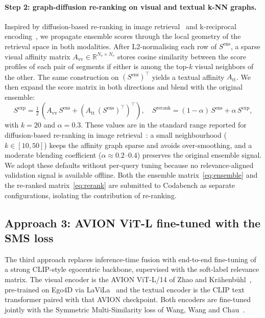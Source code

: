 \paragraph{Step 2: graph-diffusion re-ranking on visual and textual k-NN graphs.}
Inspired by diffusion-based re-ranking in image retrieval~\cite{iscen2017diffusion} and k-reciprocal encoding~\cite{zhong2017kreciprocal}, we propagate ensemble scores through the local geometry of the retrieval space in both modalities. After L2-normalising each row of $S^{\mathrm{ens}}$, a sparse visual affinity matrix $A_{\mathrm{vv}} \in \mathbb{R}^{N_v\times N_v}$ stores cosine similarity between the score profiles of each pair of segments if either is among the top-$k$ visual neighbors of the other. The same construction on $(S^{\mathrm{ens}})^{\!\top}$ yields a textual affinity $A_{\mathrm{tt}}$. We then expand the score matrix in both directions and blend with the original ensemble:
\begin{equation}
S^{\mathrm{exp}} = \tfrac{1}{2}\,(A_{\mathrm{vv}}\,S^{\mathrm{ens}} + (A_{\mathrm{tt}}\,(S^{\mathrm{ens}})^{\!\top})^{\!\top}),\quad
S^{\mathrm{rerank}} = (1-\alpha)\,S^{\mathrm{ens}} + \alpha\,S^{\mathrm{exp}},
\label{eq:rerank}
\end{equation}
with $k=20$ and $\alpha=0.3$. These values are in the standard range reported for diffusion-based re-ranking in image retrieval~\cite{iscen2017diffusion}: a small neighbourhood ($k \in [10, 50]$) keeps the affinity graph sparse and avoids over-smoothing, and a moderate blending coefficient ($\alpha \approx 0.2$--$0.4$) preserves the original ensemble signal. We adopt these defaults without per-query tuning because no relevance-aligned validation signal is available offline. Both the ensemble matrix~\eqref{eq:ensemble} and the re-ranked matrix~\eqref{eq:rerank} are submitted to Codabench as separate configurations, isolating the contribution of re-ranking.

\subsection{Approach 3: AVION ViT-L fine-tuned with the SMS loss}
\label{sec:methods:avion}

The third approach replaces inference-time fusion with end-to-end fine-tuning of a strong CLIP-style egocentric backbone, supervised with the soft-label relevance matrix. The visual encoder is the AVION ViT-L/14 of Zhao and Kr\"ahenb\"uhl~\cite{zhao2023avion}, pre-trained on Ego4D via LaViLa~\cite{zhao2023lavila} and the textual encoder is the CLIP text transformer paired with that AVION checkpoint. Both encoders are fine-tuned jointly with the Symmetric Multi-Similarity loss of Wang, Wang and Chau~\cite{wang2024symmetricmultisimilaritylossepickitchens100}.

